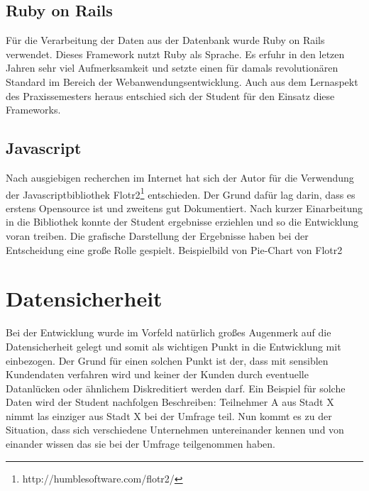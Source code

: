 \subsection{Ruby on Rails}
Für die Verarbeitung der Daten aus der Datenbank wurde Ruby on Rails verwendet. 
Dieses Framework nutzt Ruby als Sprache. Es erfuhr in den letzen Jahren sehr viel Aufmerksamkeit und setzte einen für damals revolutionären Standard im Bereich der Webanwendungsentwicklung. 
Auch aus dem Lernaspekt des Praxissemesters heraus entschied sich der Student für den Einsatz diese Frameworks.
\subsection{Javascript}
Nach ausgiebigen recherchen im Internet hat sich der Autor für die Verwendung der Javascriptbibliothek Flotr2\footnote{http://humblesoftware.com/flotr2/} entschieden. Der Grund dafür lag darin, dass es erstens Opensource ist und zweitens gut Dokumentiert. 
Nach kurzer Einarbeitung in die Bibliothek konnte der Student ergebnisse erziehlen und so die Entwicklung voran treiben. Die grafische Darstellung der Ergebnisse haben bei der Entscheidung eine große Rolle gespielt.
{Beispielbild von Pie-Chart von Flotr2}
\section{Datensicherheit}
Bei der Entwicklung wurde im Vorfeld natürlich großes Augenmerk auf die Datensicherheit gelegt und somit als wichtigen Punkt in die Entwicklung mit einbezogen. Der Grund für einen solchen Punkt ist der, dass mit sensiblen Kundendaten verfahren wird und keiner der Kunden durch eventuelle Datanlücken oder ähnlichem Diskreditiert werden darf.
Ein Beispiel für solche Daten wird der Student nachfolgen Beschreiben: 
Teilnehmer A aus Stadt X nimmt las einziger aus Stadt X bei der Umfrage teil. 
Nun kommt es zu der Situation, dass sich verschiedene Unternehmen untereinander kennen und von einander wissen das sie bei der Umfrage teilgenommen haben. 